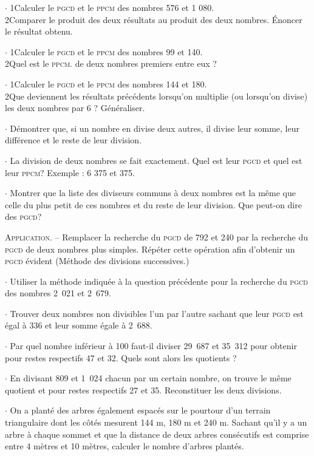                    

$\cdot$ 1\degre Calculer le \textsc{pgcd} et le \textsc{ppcm} des nombres 576 et 1 080.\\
2\degre  Comparer le produit des deux résultats au produit des deux nombres. Énoncer le résultat obtenu. 
 
 
$\cdot$ 1\degre Calculer le \textsc{pgcd} et le \textsc{ppcm}  des nombres 99 et 140.\\
2\degre  Quel est le \textsc{ppcm}. de deux nombres premiers entre eux ? 

 
$\cdot$ 1\degre Calculer le \textsc{pgcd} et le \textsc{ppcm}   des nombres 144 et 180. \\
2\degre  Que deviennent les résultats précédents lorsqu'on multiplie (ou lorsqu'on divise) les deux nombres par 6 ? Généraliser. 

$\cdot$ Démontrer que, si un nombre en divise deux autres, il divise leur somme, leur différence et le reste de leur division. 


$\cdot$  La division de deux nombres se fait exactement. Quel est leur \textsc{pgcd} et quel est leur \textsc{ppcm}? Exemple : 6 375 et 375. 

$\cdot$  Montrer que la liste des diviseurs communs à deux nombres est la même que celle du plus petit de ces nombres et du reste de leur division. Que peut-on dire des \textsc{pgcd}? 

\textsc{Application}. -- Remplacer la recherche du \textsc{pgcd} de 792 et 240 par la recherche du \textsc{pgcd} de deux nombres plus simples. Répéter cette opération afin d'obtenir un \textsc{pgcd} évident (Méthode des divisions successives.) 

$\cdot$   Utiliser la méthode indiquée à la question  précédente pour la recherche du \textsc{pgcd} des nombres 2~021 et 2~679.
 
$\cdot$  Trouver deux nombres non divisibles l'un par l'autre sachant que leur \textsc{pgcd} est égal à 336 et leur somme égale à 2~688. 
 
$\cdot$  Par quel nombre inférieur à 100 faut-il diviser 29~687 et 35~312 pour obtenir pour restes respectifs 47 et 32. Quels sont alors les quotients ? 

$\cdot$  En divisant 809 et 1~024 chacun par un certain nombre, on trouve le même quotient et pour restes respectifs 27 et 35. Reconstituer les deux divisions. 
 
$\cdot$  On a planté des arbres également espacés sur le pourtour d'un terrain triangulaire dont les côtés mesurent 144 m,  180 m et 240 m. Sachant qu'il y a un arbre à chaque sommet et que la distance de deux arbres consécutifs est comprise entre 4 mètres et 10 mètres, calculer le nombre d'arbres plantés. 
 

